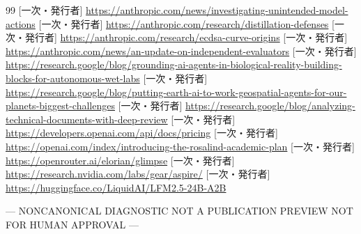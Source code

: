 \documentclass[lualatex,a4paper,10pt]{jlreq}
\begin{document}
\begin{thebibliography}{99}
 [一次・発行者] \url{https://anthropic.com/news/investigating-unintended-model-actions}
 [一次・発行者] \url{https://anthropic.com/research/distillation-defenses}
 [一次・発行者] \url{https://anthropic.com/research/ecdsa-curve-origins}
 [一次・発行者] \url{https://anthropic.com/news/an-update-on-independent-evaluators}
 [一次・発行者] \url{https://research.google/blog/grounding-ai-agents-in-biological-reality-building-blocks-for-autonomous-wet-labs}
 [一次・発行者] \url{https://research.google/blog/putting-earth-ai-to-work-geospatial-agents-for-our-planets-biggest-challenges}
 [一次・発行者] \url{https://research.google/blog/analyzing-technical-documents-with-deep-review}
 [一次・発行者] \url{https://developers.openai.com/api/docs/pricing}
 [一次・発行者] \url{https://openai.com/index/introducing-the-rosalind-academic-plan}
 [一次・発行者] \url{https://openrouter.ai/elorian/glimpse}
 [一次・発行者] \url{https://research.nvidia.com/labs/gear/aspire/}
 [一次・発行者] \url{https://huggingface.co/LiquidAI/LFM2.5-24B-A2B}
\end{thebibliography}

\begin{center}\color{SurveyMuted}--- NONCANONICAL DIAGNOSTIC \quad NOT A PUBLICATION PREVIEW \quad NOT FOR HUMAN APPROVAL ---\end{center}
\end{document}
